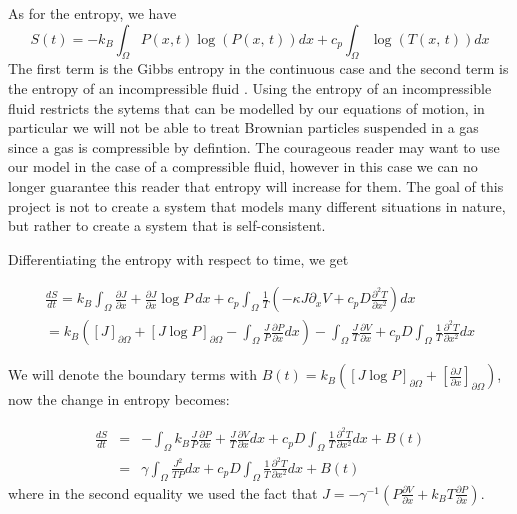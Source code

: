 As for the entropy, we have \cite{Streater1997a}
\begin{equation}
S(t) = -k_B \int_{\Omega} P(x, t) \log(P(x, \, t)) dx + c_p \int_{\Omega} \log(T(x, \, t))dx
\end{equation}
The first term is the Gibbs entropy in the continuous case \cite{Jaynes1965} and the second term is the entropy of an incompressible fluid \cite{CengelBoles1994}. Using the entropy of an incompressible fluid restricts the sytems that can be modelled by our equations of motion, in particular we will not be able to treat Brownian particles suspended in a gas since a gas is compressible by defintion. The courageous reader may want to use our model in the case of a compressible fluid, however in this case we can no longer guarantee this reader that entropy will increase for them. The goal of this project is not to create a system that models many different situations in nature, but rather to create a system that is self-consistent.

Differentiating the entropy with respect to time, we get

\begin{align}
\frac{d S}{d t} =  k_B \int_{\Omega} \frac{\partial J}{\partial x} + \frac{\partial J}{\partial x} \log P \ dx + c_p \int_{\Omega} \frac{1}{T} \left(-\kappa J \partial_x V + c_p D \frac{\partial^2 T}{\partial x^2} \right) dx \\
                     = k_B \left ( [J]_{\partial \Omega} + [J \log P]_{\partial \Omega} - \int_{\Omega} \frac{J}{P} \frac{\partial P}{\partial x} dx \right) - \int_{\Omega} \frac{J}{T} \frac{\partial V}{\partial x} + c_p D \int_{\Omega} \frac{1}{T} \frac{\partial^2 T}{\partial x^2} dx
\end{align}

We will denote the boundary terms with $B(t) = k_B( [J \log P]_{\partial \Omega} + \left[\frac{\partial J}{\partial x} \right]_{\partial \Omega} ) $, now the change in entropy becomes:

\begin{eqnarray}
\frac{d S}{d t} & = & - \int_{\Omega} k_B \frac{J}{P} \frac{\partial P}{\partial x} + \frac{J}{T} \frac{\partial V}{\partial x} dx +  c_p D \int_{\Omega} \frac{1}{T} \frac{\partial^2 T}{\partial x^2} dx + B(t) \\
                    & = & \gamma \int_{\Omega} \frac{J^2}{T P} dx + c_p D \int_{\Omega} \frac{1}{T} \frac{\partial^2 T}{\partial x^2} dx + B(t) \label{eqn:entropyGen}
\end{eqnarray}
where in the second equality we used the fact that $J = -\gamma^{-1} ( P \frac{\partial V}{\partial x} + k_B T \frac{\partial P}{\partial x})$.

